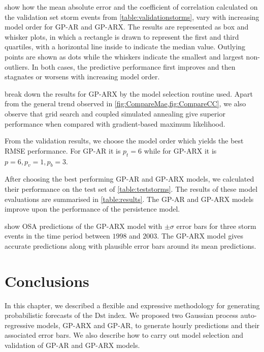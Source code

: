  show how the mean absolute error and the coefficient of correlation 
calculated on the validation set storm events from \cref{table:validationstorms}, vary with 
increasing model order for GP-AR and GP-ARX. The results are represented as box and whisker plots, 
in which a rectangle is drawn to represent the first and third quartiles, with a horizontal line 
inside to indicate the median value. Outlying points are shown as dots while the whiskers indicate 
the smallest and largest non-outliers. In both cases, the predictive performance first improves and 
then stagnates or worsens with increasing model order. 

 break down the results for GP-ARX by the model selection 
routine used. Apart from the general trend observed in \cref{fig:CompareMae,fig:CompareCC}, we also 
observe that grid search and coupled simulated annealing give superior performance when 
compared with gradient-based maximum likelihood.

From the validation results, we choose the model order which yields the best RMSE performance. For 
GP-AR it is $p_t = 6$ while for GP-ARX it is $p = 6, p_v = 1, p_b = 3$.

After choosing the best performing GP-AR and GP-ARX models, we calculated their performance on the 
test set of \cref{table:teststorms}. The results of these model evaluations are summarised in 
\cref{table:results}. The GP-AR and GP-ARX models improve upon the performance of the 
persistence model.

 show OSA predictions of the GP-ARX model 
with $\pm \sigma$ error bars for three storm events in the time period between $1998$ and $2003$. 
The GP-ARX model gives accurate predictions along with plausible error bars around its mean 
predictions.

\section{Conclusions}

In this chapter, we described a flexible and expressive methodology for generating probabilistic 
forecasts of the $\mathrm{Dst}$ index. We proposed two Gaussian process auto-regressive 
models, GP-ARX and GP-AR, to generate hourly predictions and their associated error 
bars. We also describe how to carry out model selection and validation of GP-AR and GP-ARX models.


